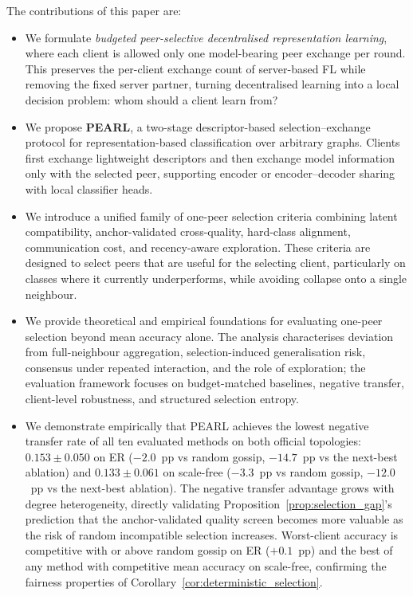 \documentclass[conference]{IEEEtran}
\begin{document}
The contributions of this paper are:
\begin{itemize}
    \item We formulate \emph{budgeted peer-selective decentralised representation learning}, where each client is allowed only one model-bearing peer exchange per round. This preserves the per-client exchange count of server-based FL while removing the fixed server partner, turning decentralised learning into a local decision problem: whom should a client learn from?

    \item We propose \textbf{PEARL}, a two-stage descriptor-based selection--exchange protocol for representation-based classification over arbitrary graphs. Clients first exchange lightweight descriptors and then exchange model information only with the selected peer, supporting encoder or encoder--decoder sharing with local classifier heads.

    \item We introduce a unified family of one-peer selection criteria combining latent compatibility, anchor-validated cross-quality, hard-class alignment, communication cost, and recency-aware exploration. These criteria are designed to select peers that are useful for the selecting client, particularly on classes where it currently underperforms, while avoiding collapse onto a single neighbour.

    \item We provide theoretical and empirical foundations for evaluating one-peer selection beyond mean accuracy alone. The analysis characterises deviation from full-neighbour aggregation, selection-induced generalisation risk, consensus under repeated interaction, and the role of exploration; the evaluation framework focuses on budget-matched baselines, negative transfer, client-level robustness, and structured selection entropy.

    \item We demonstrate empirically that \textsc{PEARL} achieves the lowest negative transfer rate of all ten evaluated methods on both official topologies: $0.153\pm0.050$ on ER ($-2.0$~pp vs random gossip, $-14.7$~pp vs the next-best ablation) and $0.133\pm0.061$ on scale-free ($-3.3$~pp vs random gossip, $-12.0$~pp vs the next-best ablation). The negative transfer advantage grows with degree heterogeneity, directly validating Proposition~\ref{prop:selection_gap}'s prediction that the anchor-validated quality screen becomes more valuable as the risk of random incompatible selection increases. Worst-client accuracy is competitive with or above random gossip on ER ($+0.1$~pp) and the best of any method with competitive mean accuracy on scale-free, confirming the fairness properties of Corollary~\ref{cor:deterministic_selection}.


\end{itemize}
\end{document}
